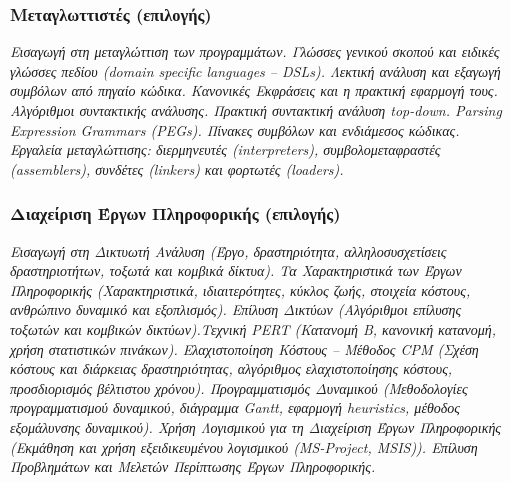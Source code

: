 \hypertarget{ux3bcux3b5ux3c4ux3b1ux3b3ux3bbux3c9ux3c4ux3c4ux3b9ux3c3ux3c4ux3adux3c2-ux3b5ux3c0ux3b9ux3bbux3bfux3b3ux3aeux3c2}{%
\subsubsection{Μεταγλωττιστές
(επιλογής)}\label{ux3bcux3b5ux3c4ux3b1ux3b3ux3bbux3c9ux3c4ux3c4ux3b9ux3c3ux3c4ux3adux3c2-ux3b5ux3c0ux3b9ux3bbux3bfux3b3ux3aeux3c2}}

\emph{Εισαγωγή στη μεταγλώττιση των προγραμμάτων. Γλώσσες γενικού σκοπού
και ειδικές γλώσσες πεδίου (domain specific languages -- DSLs). Λεκτική
ανάλυση και εξαγωγή συμβόλων από πηγαίο κώδικα. Κανονικές Εκφράσεις και
η πρακτική εφαρμογή τους. Αλγόριθμοι συντακτικής ανάλυσης. Πρακτική
συντακτική ανάλυση top-down. Parsing Expression Grammars (PEGs). Πίνακες
συμβόλων και ενδιάμεσος κώδικας. Εργαλεία μεταγλώττισης: διερμηνευτές
(interpreters), συμβολομεταφραστές (assemblers), συνδέτες (linkers) και
φορτωτές (loaders).}

\hypertarget{ux3b4ux3b9ux3b1ux3c7ux3b5ux3afux3c1ux3b9ux3c3ux3b7-ux3adux3c1ux3b3ux3c9ux3bd-ux3c0ux3bbux3b7ux3c1ux3bfux3c6ux3bfux3c1ux3b9ux3baux3aeux3c2-ux3b5ux3c0ux3b9ux3bbux3bfux3b3ux3aeux3c2}{%
\subsubsection{Διαχείριση Έργων Πληροφορικής
(επιλογής)}\label{ux3b4ux3b9ux3b1ux3c7ux3b5ux3afux3c1ux3b9ux3c3ux3b7-ux3adux3c1ux3b3ux3c9ux3bd-ux3c0ux3bbux3b7ux3c1ux3bfux3c6ux3bfux3c1ux3b9ux3baux3aeux3c2-ux3b5ux3c0ux3b9ux3bbux3bfux3b3ux3aeux3c2}}

\emph{Εισαγωγή στη Δικτυωτή Ανάλυση (Έργο, δραστηριότητα,
αλληλοσυσχετίσεις δραστηριοτήτων, τοξωτά και κομβικά δίκτυα). Τα
Χαρακτηριστικά των Έργων Πληροφορικής (Χαρακτηριστικά, ιδιαιτερότητες,
κύκλος ζωής, στοιχεία κόστους, ανθρώπινο δυναμικό και εξοπλισμός).
Επίλυση Δικτύων (Αλγόριθμοι επίλυσης τοξωτών και κομβικών
δικτύων).Τεχνική PERT (Κατανομή Β, κανονική κατανομή, χρήση στατιστικών
πινάκων). Ελαχιστοποίηση Κόστους -- Μέθοδος CPM (Σχέση κόστους και
διάρκειας δραστηριότητας, αλγόριθμος ελαχιστοποίησης κόστους,
προσδιορισμός βέλτιστου χρόνου). Προγραμματισμός Δυναμικού (Μεθοδολογίες
προγραμματισμού δυναμικού, διάγραμμα Gantt, εφαρμογή heuristics, μέθοδος
εξομάλυνσης δυναμικού). Χρήση Λογισμικού για τη Διαχείριση Έργων
Πληροφορικής (Εκμάθηση και χρήση εξειδικευμένου λογισμικού (MS-Project,
MSIS)). Επίλυση Προβλημάτων και Μελετών Περίπτωσης Έργων Πληροφορικής.}

